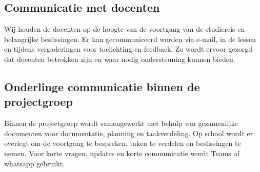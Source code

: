 \subsection{Communicatie met docenten}
Wij houden de docenten op de hoogte van de voortgang van de studiereis en belangrijke beslissingen. Er kan gecommuniceerd worden via e-mail, in de lessen en tijdens vergaderingen voor toelichting en feedback. Zo wordt ervoor gezorgd dat docenten betrokken zijn en waar nodig ondersteuning kunnen bieden.

\subsection{Onderlinge communicatie binnen de projectgroep}
Binnen de projectgroep wordt samengewerkt met behulp van gezamenlijke documenten voor documentatie, planning en taakverdeling. Op school wordt er overlegt om de voortgang te bespreken, taken te verdelen en beslissingen te nemen. Voor korte vragen, updates en korte communicatie wordt Teams of whatsapp gebruikt.